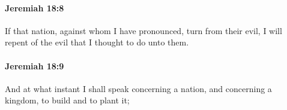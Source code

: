 		\paragraph{Jeremiah 18:8} %
			\label{JEREMIAH-18-8}

			If that nation, against whom I have pronounced, turn from their evil, I will repent of the evil that I thought to do unto them.


		\paragraph{Jeremiah 18:9} %
			\label{JEREMIAH-18-9}

			And at what instant I shall speak concerning a nation, and concerning a kingdom, to build and to plant it;


